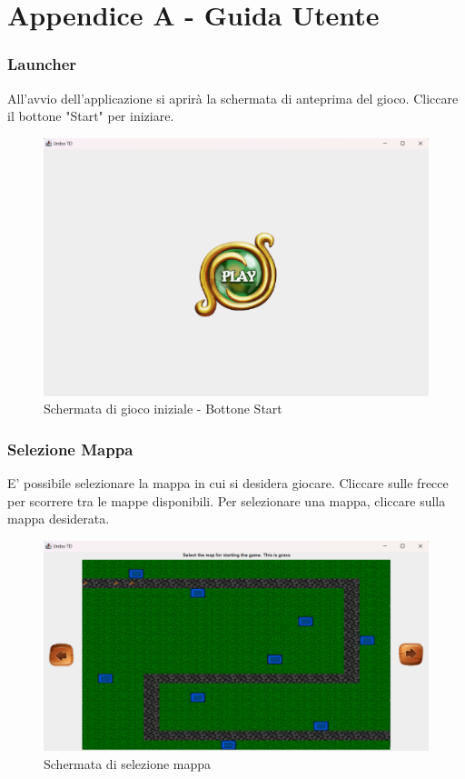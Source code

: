 \documentclass[a4paper,12pt]{report}
\begin{document}
\newpage
\chapter{Appendice A - Guida Utente}

\subsection{Launcher}
All'avvio dell'applicazione si aprirà la schermata di anteprima del gioco. Cliccare il bottone "Start" per iniziare.

\begin{figure}[H]
    \centering
    \includegraphics[width=\linewidth]{Start}
    \caption{Schermata di gioco iniziale - Bottone Start}
    \label{fig:start}
\end{figure}

\subsection{Selezione Mappa}
E' possibile selezionare la mappa in cui si desidera giocare. Cliccare sulle frecce per scorrere tra le mappe disponibili. Per selezionare una mappa, cliccare sulla mappa desiderata.

\begin{figure}[H]
    \centering
    \includegraphics[width=\linewidth]{map}
    \caption{Schermata di selezione mappa}
    \label{fig:map}
\end{figure}
\end{document}
